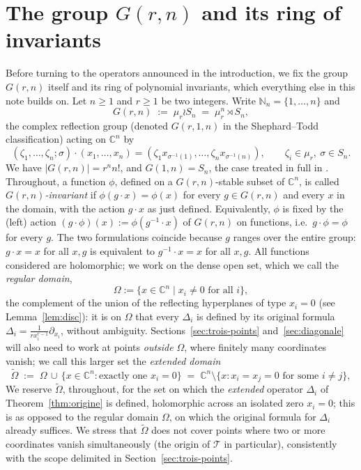\documentclass[10pt,a4paper]{amsart}
\newcommand{\NN}{\mathbb{N}}
\newcommand{\CC}{\mathbb{C}}
\begin{document}
\section{The group $G(r,n)$ and its ring of invariants}

Before turning to the operators announced in the introduction, we fix the group $G(r,n)$ itself and its ring of polynomial invariants, which everything else in this note builds on. Let $n\ge 1$ and $r\ge 1$ be two integers. Write $\NN_n=\{1,\dots,n\}$ and
\[
G(r,n) \;:=\; \mu_r \wr S_n \;=\; \mu_r^n \rtimes S_n,
\]
the complex reflection group (denoted $G(r,1,n)$ in the Shephard--Todd classification) acting on $\CC^n$ by
\[
(\zeta_1,\dots,\zeta_n;\sigma)\cdot(x_1,\dots,x_n) = (\zeta_1 x_{\sigma^{-1}(1)},\dots,\zeta_n x_{\sigma^{-1}(n)}), \qquad \zeta_i\in\mu_r,\ \sigma\in S_n.
\]
We have $|G(r,n)|=r^n n!$, and $G(1,n)=S_n$, the case treated in full in \cite{Ze}. Throughout, a function $\phi$, defined on a $G(r,n)$-stable subset of $\CC^n$, is called \emph{$G(r,n)$-invariant} if $\phi(g\cdot x)=\phi(x)$ for every $g\in G(r,n)$ and every $x$ in the domain, with the action $g\cdot x$ as just defined. Equivalently, $\phi$ is fixed by the (left) action $(g\cdot\phi)(x):=\phi(g^{-1}\cdot x)$ of $G(r,n)$ on functions, i.e.\ $g\cdot\phi=\phi$ for every $g$. The two formulations coincide because $g$ ranges over the entire group: $g\cdot x=x$ for all $x,g$ is equivalent to $g^{-1}\cdot x=x$ for all $x,g$. All functions considered are holomorphic; we work on the dense open set, which we call the \emph{regular domain},
\[
\Omega := \{x\in\CC^n \mid x_i\neq 0 \text{ for all } i\},
\]
the complement of the union of the reflecting hyperplanes of type $x_i=0$ (see Lemma~\ref{lem:disc}): it is on $\Omega$ that every $\Delta_i$ is defined by its original formula $\Delta_i=\frac{1}{rx_i^{r-1}}\partial_{x_i}$, without ambiguity. Sections~\ref{sec:trois-points} and~\ref{sec:diagonale} will also need to work at points \emph{outside} $\Omega$, where finitely many coordinates vanish; we call this larger set the \emph{extended domain}
\[
\widetilde\Omega \;:=\; \Omega\,\cup\,\{x\in\CC^n : \text{exactly one } x_i=0\} \;=\; \CC^n\setminus\{x: x_i=x_j=0 \text{ for some } i\ne j\},
\]
We reserve $\widetilde\Omega$, throughout, for the set on which the \emph{extended} operator $\Delta_i$ of Theorem~\ref{thm:origine} is defined, holomorphic across an isolated zero $x_i=0$; this is as opposed to the regular domain $\Omega$, on which the original formula for $\Delta_i$ already suffices. We stress that $\widetilde\Omega$ does not cover points where two or more coordinates vanish simultaneously (the origin of $\mathcal T$ in particular), consistently with the scope delimited in Section~\ref{sec:trois-points}.
\end{document}
